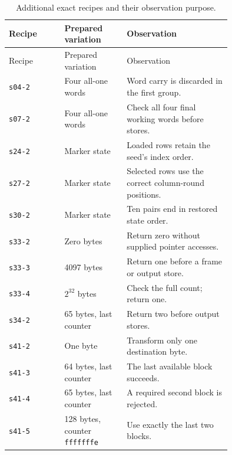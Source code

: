 \begin{longtable}{lp{0.28\linewidth}p{0.47\linewidth}}
  \caption{Additional exact recipes and their observation purpose.}                                              \\
  \toprule Recipe & Prepared variation                   & Observation                                           \\\midrule\endfirsthead
  \toprule Recipe & Prepared variation                   & Observation                                           \\\midrule\endhead
  \texttt{s04-2}  & Four all-one words                   & Word carry is discarded in the first group.           \\
  \texttt{s07-2}  & Four all-one words                   & Check all four final working words before stores.     \\
  \texttt{s24-2}  & Marker state                         & Loaded rows retain the seed's index order.            \\
  \texttt{s27-2}  & Marker state                         & Selected rows use the correct column-round positions. \\
  \texttt{s30-2}  & Marker state                         & Ten pairs end in restored state order.                \\
  \texttt{s33-2}  & Zero bytes                           & Return zero without supplied pointer accesses.        \\
  \texttt{s33-3}  & 4097 bytes                           & Return one before a frame or output store.            \\
  \texttt{s33-4}  & \(2^{32}\) bytes                     & Check the full count; return one.                     \\
  \texttt{s34-2}  & 65 bytes, last counter               & Return two before output stores.                      \\
  \texttt{s41-2}  & One byte                             & Transform only one destination byte.                  \\
  \texttt{s41-3}  & 64 bytes, last counter               & The last available block succeeds.                    \\
  \texttt{s41-4}  & 65 bytes, last counter               & A required second block is rejected.                  \\
  \texttt{s41-5}  & 128 bytes, counter \texttt{fffffffe} & Use exactly the last two blocks.                      \\

\end{longtable}
